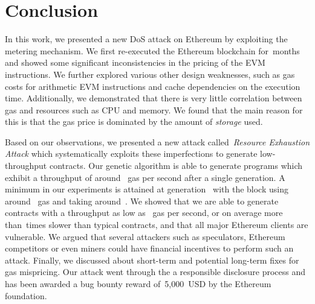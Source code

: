 \section{Conclusion}
\label{sec:conclusion}

In this work, we presented a new DoS attack on Ethereum by exploiting the metering mechanism. We first re-executed the Ethereum blockchain for~\Months months and showed some significant inconsistencies in the pricing of the EVM instructions. We further explored various other design weaknesses, such as gas costs for arithmetic EVM instructions and cache dependencies on the execution time. Additionally, we demonstrated that there is very little correlation between gas and resources such as CPU and memory. We found that the main reason for this is that the gas price is dominated by the amount of \emph{storage} used.

Based on our observations, we presented a new attack called~\emph{Resource Exhaustion Attack} which systematically exploits these imperfections to generate low-throughput contracts. Our genetic algorithm is able to generate programs which exhibit a throughput of around~ gas per second after a single generation. A minimum in our experiments is attained at generation~ with the block using around~ gas and taking around~. We showed that we are able to generate contracts with a throughput as low as~ gas per second, or on average more than~\Slowdown times slower than typical contracts, and that all major Ethereum clients are vulnerable. We argued that several attackers such as speculators, Ethereum competitors or even miners could have financial incentives to perform such an attack. Finally, we discussed about short-term and potential long-term fixes for gas mispricing. Our attack went through the a responsible disclosure process and has been awarded a bug bounty reward of~5,000~USD by the Ethereum foundation.
